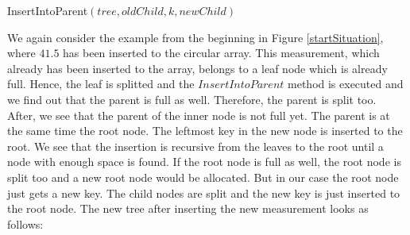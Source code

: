 \documentclass[abstracton,12pt]{scrreprt}
\begin{document}
\begin{algorithm}[H]
	\IncMargin{1em}
	\SetAlgoLined
	\DontPrintSemicolon
	
	\caption{InsertIntoParent$(tree, oldChild, k, newChild)$}	\label{InsertIntoParent}
\end{algorithm}


\begin{exmp}
We again consider the example from the beginning in Figure \ref{startSituation}, where $41.5$ has been inserted to the circular array. This measurement, which already has been inserted to the array, belongs to a leaf node which is already full. Hence, the leaf is splitted and the $InsertIntoParent$ method is executed and we find out that the parent is full as well. Therefore, the parent is split too. After, we see that the parent of the inner node is not full yet. The parent is at the same time the root node. The leftmost key in the new node is inserted to the root. We see that the insertion is recursive from the leaves to the root until a node with enough space is found. If the root node is full as well, the root node is split too and a new root node would be allocated. But in our case the root node just gets a new key. The child nodes are split and the new key is just inserted to the root node. The new tree after inserting the new measurement looks as follows:  
\end{exmp}
\end{document}

